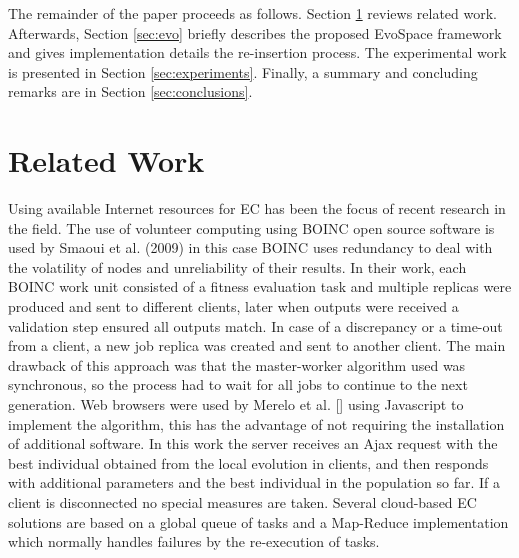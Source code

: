 \documentclass{llncs}
\begin{document}
The remainder of the paper proceeds as follows. Section \ref{sec:work} reviews related work. Afterwards, Section \ref{sec:evo} briefly describes the proposed EvoSpace framework and gives implementation details the re-insertion process.
The experimental work is presented in Section \ref{sec:experiments}.
Finally, a summary and concluding remarks are in Section \ref{sec:conclusions}.

\section{Related Work}
\label{sec:work}
Using available Internet resources for EC has been the focus of recent research in the field. The use of volunteer computing using BOINC open source software is used by Smaoui et al. (2009) in this case BOINC uses redundancy to deal with the volatility of nodes and unreliability of their results. In their work, each BOINC work unit consisted of a fitness evaluation task and multiple replicas were produced and sent to different clients, later when outputs were received a validation step ensured all outputs match. In case of a discrepancy or a time-out from a client, a new job replica was created and sent to another client. The main drawback of this approach was that the master-worker algorithm used was synchronous, so the process had to wait for all jobs to continue to the next generation. Web browsers were used by Merelo et al. [] using Javascript to implement the algorithm, this has the advantage of not requiring the installation of additional software. In this work the server receives an Ajax request with the best individual obtained from the local evolution in clients, and then responds with additional parameters and the best individual in the population so far. If a client is disconnected no special measures are taken. Several cloud-based EC solutions are based on a  global queue of tasks and a Map-Reduce implementation which normally handles failures by the re-execution of tasks. 


 
\end{document}
